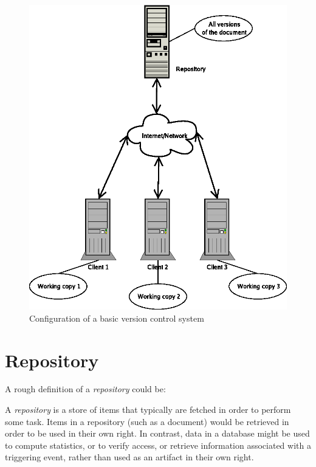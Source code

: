 \begin{figure}[ht]
\begin{center}
\includegraphics{img/vcs.eps}
\end{center}
\caption{Configuration of a basic version control system}
\label{fig:vcs}
\end{figure}

\section{Repository}

A rough definition of a \emph{repository} could be:

\begin{defi}
A \emph{repository} is a store of items that typically are fetched in order to perform some task.
Items in a repository (such as a document) would be retrieved in order to be used in their own
right. In contrast, data in a database might be used to compute statistics, or to verify access,
or retrieve information associated with a triggering event, rather than used as an artifact
in their own right.
\end{defi}

